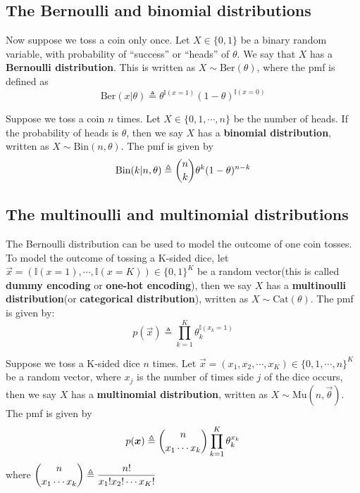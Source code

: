 \subsection{The Bernoulli and binomial distributions}

\begin{definition}
Now suppose we toss a coin only once. Let $X \in \{0,1\}$ be a binary random variable, with probability of “success” or “heads” of $\theta$. We say that $X$ has a \textbf{Bernoulli distribution}. This is written as $X \sim \text{Ber}(\theta)$, where the pmf is defined as 
\begin{equation}
\text{Ber}(x|\theta) \triangleq \theta^{\mathbb{I}(x=1)}(1-\theta)^{\mathbb{I}(x=0)}
\end{equation}
\end{definition}


\begin{definition}
Suppose we toss a coin $n$ times. Let $X \in \{0,1,\cdots,n\}$ be the number of heads. If the probability of heads is $\theta$, then we say $X$ has a \textbf{binomial distribution}, written as $X \sim \text{Bin}(n, \theta)$. The pmf is given by 
\begin{equation}\label{eqn:binomial-pmf}
\text{Bin}(k|n,\theta) \triangleq \dbinom{n}{k}\theta^k(1-\theta)^{n-k}
\end{equation}
\end{definition}


\subsection{The multinoulli and multinomial distributions}

\begin{definition}
The Bernoulli distribution can be used to model the outcome of one coin tosses. To model the outcome of tossing a K-sided dice, let $\vec{x} =(\mathbb{I}(x=1),\cdots,\mathbb{I}(x=K)) \in \{0,1\}^K$ be a random vector(this is called \textbf{dummy encoding} or \textbf{one-hot encoding}), then we say $X$ has a \textbf{multinoulli distribution}(or \textbf{categorical distribution}), written as $X \sim \text{Cat}(\theta)$. The pmf is given by: 
\begin{equation}
p(\vec{x}) \triangleq \prod\limits_{k=1}^K\theta_k^{\mathbb{I}(x_k=1)}
\end{equation}
\end{definition}

\begin{definition}
Suppose we toss a K-sided dice $n$ times. Let $\vec{x} =(x_1,x_2,\cdots,x_K) \in \{0,1,\cdots,n\}^K$ be a random vector, where $x_j$ is the number of times side $j$ of the dice occurs, then we say $X$ has a \textbf{multinomial distribution}, written as $X \sim \text{Mu}(n, \vec{\theta})$. The pmf is given by 
\begin{equation}\label{eqn:multinomial-pmf}
p(\vec{x}) \triangleq \dbinom{n}{x_1 \cdots x_k} \prod\limits_{k=1}^K\theta_k^{x_k}
\end{equation}
where $\dbinom{n}{x_1 \cdots x_k} \triangleq \dfrac{n!}{x_1!x_2! \cdots x_K!}$
\end{definition}

